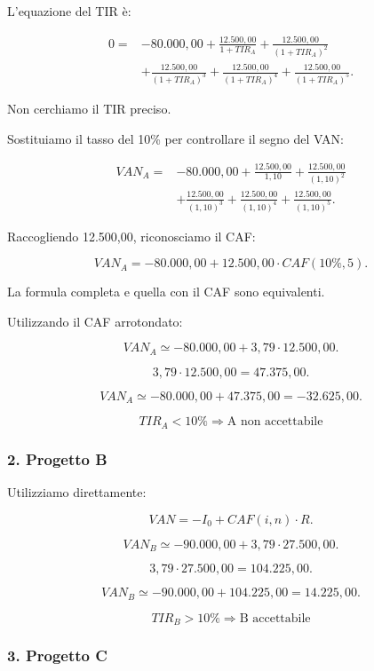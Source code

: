 \noindent L'equazione del TIR è:

\[
\begin{aligned}
0={}&-80.000{,}00
+\frac{12.500{,}00}{1+TIR_A}
+\frac{12.500{,}00}{(1+TIR_A)^2}\\
&+\frac{12.500{,}00}{(1+TIR_A)^3}
+\frac{12.500{,}00}{(1+TIR_A)^4}
+\frac{12.500{,}00}{(1+TIR_A)^5}.
\end{aligned}
\]

\noindent Non cerchiamo il TIR preciso.

\noindent Sostituiamo il tasso del 10\%
per controllare il segno del VAN:

\[
\begin{aligned}
VAN_A={}&-80.000{,}00
+\frac{12.500{,}00}{1{,}10}
+\frac{12.500{,}00}{(1{,}10)^2}\\
&+\frac{12.500{,}00}{(1{,}10)^3}
+\frac{12.500{,}00}{(1{,}10)^4}
+\frac{12.500{,}00}{(1{,}10)^5}.
\end{aligned}
\]

\noindent Raccogliendo 12.500,00,
riconosciamo il CAF:

\[
VAN_A
=
-80.000{,}00
+
12.500{,}00\cdot CAF(10\%,5).
\]

\noindent La formula completa
e quella con il CAF sono equivalenti.

\noindent Utilizzando il CAF arrotondato:

\[
VAN_A
\simeq
-80.000{,}00
+
3{,}79\cdot12.500{,}00.
\]

\[
3{,}79\cdot12.500{,}00
=
47.375{,}00.
\]

\[
VAN_A
\simeq
-80.000{,}00+47.375{,}00
=
\boxed{-32.625{,}00}.
\]

\[
\boxed{
TIR_A<10\%
\Rightarrow
\text{A non accettabile}
}
\]


\subsubsection*{2. Progetto B}

\noindent Utilizziamo direttamente:

\[
VAN=-I_0+CAF(i,n)\cdot R.
\]

\[
VAN_B
\simeq
-90.000{,}00+3{,}79\cdot27.500{,}00.
\]

\[
3{,}79\cdot27.500{,}00
=
104.225{,}00.
\]

\[
VAN_B
\simeq
-90.000{,}00+104.225{,}00
=
\boxed{14.225{,}00}.
\]

\[
\boxed{
TIR_B>10\%
\Rightarrow
\text{B accettabile}
}
\]


\subsubsection*{3. Progetto C}

